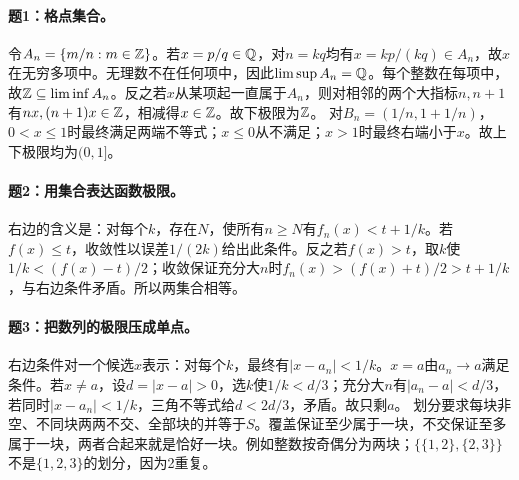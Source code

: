 \paragraph{题1：格点集合。}令$A_n=\{m/n:m\in\mathbb{Z}\}$。若$x=p/q\in\mathbb{Q}$，对$n=kq$均有$x=kp/(kq)\in A_n$，故$x$在无穷多项中。无理数不在任何项中，因此$\limsup A_n=\mathbb{Q}$。每个整数在每项中，故$\mathbb{Z}\subseteq\liminf A_n$。反之若$x$从某项起一直属于$A_n$，则对相邻的两个大指标$n,n+1$有$nx,(n+1)x\in\mathbb{Z}$，相减得$x\in\mathbb{Z}$。故下极限为$\mathbb{Z}$。
对$B_n=(1/n,1+1/n)$，$0<x\le1$时最终满足两端不等式；$x\le0$从不满足；$x>1$时最终右端小于$x$。故上下极限均为$(0,1]$。
\paragraph{题2：用集合表达函数极限。}右边的含义是：对每个$k$，存在$N$，使所有$n\ge N$有$f_n(x)<t+1/k$。若$f(x)\le t$，收敛性以误差$1/(2k)$给出此条件。反之若$f(x)>t$，取$k$使$1/k<(f(x)-t)/2$；收敛保证充分大$n$时$f_n(x)>(f(x)+t)/2>t+1/k$，与右边条件矛盾。所以两集合相等。
\paragraph{题3：把数列的极限压成单点。}右边条件对一个候选$x$表示：对每个$k$，最终有$|x-a_n|<1/k$。$x=a$由$a_n\to a$满足条件。若$x\ne a$，设$d=|x-a|>0$，选$k$使$1/k<d/3$；充分大$n$有$|a_n-a|<d/3$，若同时$|x-a_n|<1/k$，三角不等式给$d<2d/3$，矛盾。故只剩$a$。
划分要求每块非空、不同块两两不交、全部块的并等于$S$。覆盖保证至少属于一块，不交保证至多属于一块，两者合起来就是恰好一块。例如整数按奇偶分为两块；$\{\{1,2\},\{2,3\}\}$不是$\{1,2,3\}$的划分，因为2重复。
